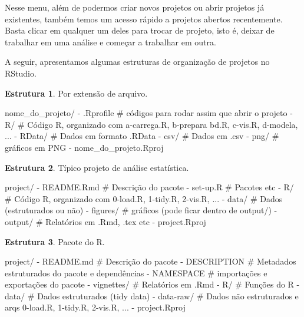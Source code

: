 \documentclass[]{book}
\newenvironment{Shaded}{\begin{snugshade}}{\end{snugshade}}
\newcommand{\ExtensionTok}[1]{#1}
\newcommand{\NormalTok}[1]{#1}
\begin{document}
Nesse menu, além de podermos criar novos projetos ou abrir projetos já existentes, também temos um acesso rápido a projetos abertos recentemente. Basta clicar em qualquer um deles para trocar de projeto, isto é, deixar de trabalhar em uma análise e começar a trabalhar em outra.

A seguir, apresentamos algumas estruturas de organização de projetos no RStudio.

\textbf{Estrutura 1}. Por extensão de arquivo.

\begin{Shaded}
\begin{Highlighting}[]
\ExtensionTok{nome_do_projeto/}
  \ExtensionTok{-}\NormalTok{ .Rprofile   # códigos para rodar assim que abrir o projeto}
  \ExtensionTok{-}\NormalTok{ R/          # Código R, organizado com a-carrega.R, b-prepara bd.R, c-vis.R, d-modela, ...}
  \ExtensionTok{-}\NormalTok{ RData/      # Dados em formato .RData}
  \ExtensionTok{-}\NormalTok{ csv/        # Dados em .csv}
  \ExtensionTok{-}\NormalTok{ png/        # gráficos em PNG}
  \ExtensionTok{-}\NormalTok{ nome_do_projeto.Rproj}
\end{Highlighting}
\end{Shaded}

\textbf{Estrutura 2}. Típico projeto de análise estatística.

\begin{Shaded}
\begin{Highlighting}[]
\ExtensionTok{project/}
  \ExtensionTok{-}\NormalTok{ README.Rmd   # Descrição do pacote}
  \ExtensionTok{-}\NormalTok{ set-up.R     # Pacotes etc}
  \ExtensionTok{-}\NormalTok{ R/           # Código R, organizado com 0-load.R, 1-tidy.R, 2-vis.R, ...}
  \ExtensionTok{-}\NormalTok{ data/        # Dados (estruturados ou não)}
  \ExtensionTok{-}\NormalTok{ figures/     # gráficos (pode ficar dentro de output/)}
  \ExtensionTok{-}\NormalTok{ output/      # Relatórios em .Rmd, .tex etc}
  \ExtensionTok{-}\NormalTok{ project.Rproj}
\end{Highlighting}
\end{Shaded}

\textbf{Estrutura 3}. Pacote do R.

\begin{Shaded}
\begin{Highlighting}[]
\ExtensionTok{project/}
  \ExtensionTok{-}\NormalTok{ README.md    # Descrição do pacote}
  \ExtensionTok{-}\NormalTok{ DESCRIPTION  # Metadados estruturados do pacote e dependências}
  \ExtensionTok{-}\NormalTok{ NAMESPACE    # importações e exportações do pacote}
  \ExtensionTok{-}\NormalTok{ vignettes/   # Relatórios em .Rmd}
  \ExtensionTok{-}\NormalTok{ R/           # Funções do R}
  \ExtensionTok{-}\NormalTok{ data/        # Dados estruturados (tidy data)}
  \ExtensionTok{-}\NormalTok{ data-raw/    # Dados não estruturados e arqs 0-load.R, 1-tidy.R, 2-vis.R, ...}
  \ExtensionTok{-}\NormalTok{ project.Rproj}
\end{Highlighting}
\end{Shaded}
\end{document}

